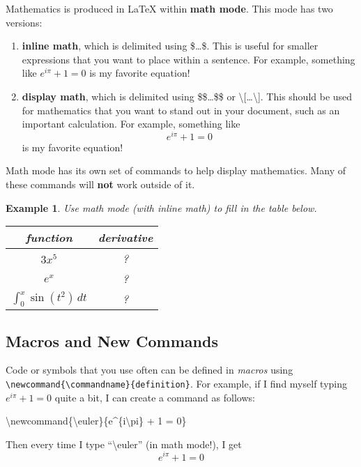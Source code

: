 \documentclass{article}
\newtheorem{example}[theorem]{Example}
\newcommand{\euler}{e^{i\pi} + 1 = 0}
\begin{document}
Mathematics is produced in \LaTeX{} within \textbf{math mode}.
This mode has two versions:
\begin{enumerate}
    \item \textbf{inline math}, which is delimited using \$\ldots\$.
    This is useful for smaller expressions that you want to place within a sentence.
    For example, something like $e^{i\pi} + 1 = 0$ is my favorite equation!
    
    \item \textbf{display math}, which is delimited using \$\$\ldots\$\$ or \textbackslash[\ldots\textbackslash].
    This should be used for mathematics that you want to stand out in your document, such as an important calculation.
    For example, something like
    \[
        e^{i\pi} + 1 = 0
    \]
    is my favorite equation!
\end{enumerate}
Math mode has its own set of commands to help display mathematics.
Many of these commands will \textbf{not} work outside of it.
\begin{example}
    Use math mode (with inline math) to fill in the table below.
    \begin{center}
    \begin{tabular}{||c|c||}
        function & derivative \\
        \hline\hline
        $3x^{5}$ & ?\\
        $e^{x}$ & ?\\
        $\int_{0}^{x}\sin(t^{2})\,dt$ & ?\\
    \end{tabular}
    \end{center}
\end{example}

\subsection{Macros and New Commands}

Code or symbols that you use often can be defined in \textit{macros} using \texttt{\textbackslash newcommand\{\textbackslash commandname\}\{definition\}}.
For example, if I find myself typing $e^{i\pi}+1 = 0$ quite a bit, I can create a command as follows:
\begin{center}
    \textbackslash newcommand\{\textbackslash euler\}\{e\^{}\{i\textbackslash pi\} + 1 = 0\} %
\end{center}
Then every time I type ``\textbackslash euler'' (in math mode!), I get
\[
    \euler
\]
\end{document}
